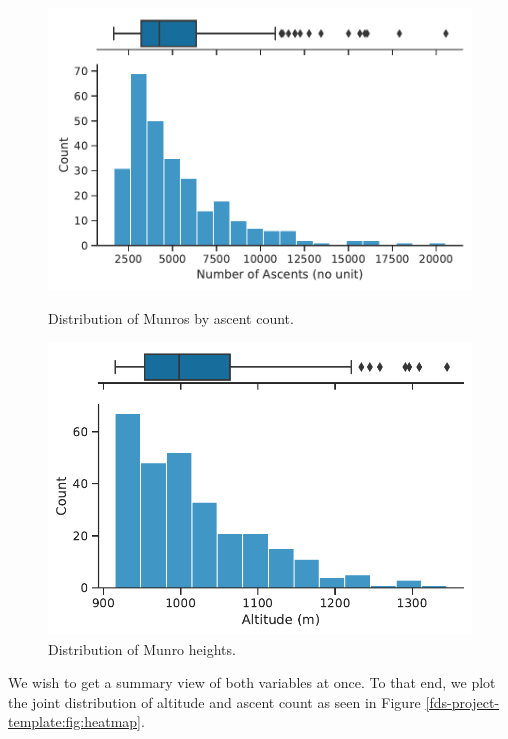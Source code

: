 \documentclass[11pt,a4paper]{article}
\begin{document}
\begin{figure}[h!]
   \begin{minipage}{0.48\textwidth}
     \centering
     \includegraphics[width=1.2\linewidth]{report/ascent_distribution.pdf}
     \caption{Distribution of Munros by ascent count.}
     \label{fds-project-template:fig:ascent_dis}
   \end{minipage}\hfill
   \begin{minipage}{0.48\textwidth}
     \centering
     \includegraphics[width=1.2\linewidth]{report/altitude_distribution.pdf}
     \caption{Distribution of Munro heights.}
     \label{fds-project-template:fig:altitude_dis}
   \end{minipage}
\end{figure}


We wish to get a summary view of both variables at once. To that end, we plot the joint distribution of altitude and ascent count as seen in Figure \ref{fds-project-template:fig:heatmap}.
\end{document}
